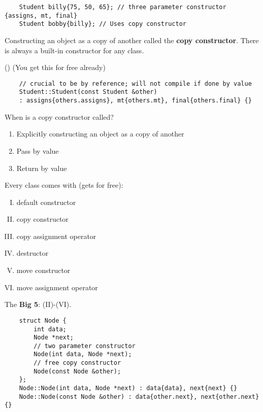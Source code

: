 \begin{lstlisting}
    Student billy{75, 50, 65}; // three parameter constructor {assigns, mt, final}
    Student bobby{billy}; // Uses copy constructor
\end{lstlisting}
Constructing an object as a copy of another called the \textbf{copy constructor}.
There is always a built-in constructor for any class.

() (You get this for free already)
\begin{lstlisting}
    // crucial to be by reference; will not compile if done by value
    Student::Student(const Student &other)
    : assigns{others.assigns}, mt{others.mt}, final{others.final} {}
\end{lstlisting}
When is a copy constructor called?
\begin{enumerate}[(1)]
    \item Explicitly constructing an object as a copy of another
    \item Pass by value
    \item Return by value
\end{enumerate}
Every class comes with (gets for free):
\begin{enumerate}[(I)]
    \item default constructor
    \item copy constructor
    \item copy assignment operator
    \item destructor
    \item move constructor
    \item move assignment operator
\end{enumerate}
The \textbf{Big 5}: (II)-(VI).

\begin{lstlisting}
    struct Node {
        int data;
        Node *next;
        // two parameter constructor
        Node(int data, Node *next);
        // free copy constructor
        Node(const Node &other);
    };
    Node::Node(int data, Node *next) : data{data}, next{next} {}
    Node::Node(const Node &other) : data{other.next}, next{other.next} {}
\end{lstlisting}

